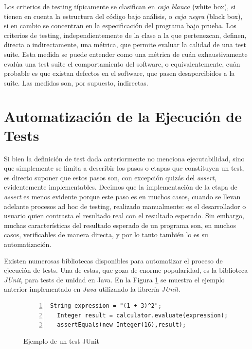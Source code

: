 Los criterios de testing t\'ipicamente se clasifican en \emph{caja blanca} (white box), si tienen en cuenta la estructura del c\'odigo bajo an\'alisis, o \emph{caja negra} (black box), si en cambio se concentran en la especificaci\'on del programa bajo prueba. Los criterios de testing, independientemente de la clase a la que pertenezcan, definen, directa o indirectamente, una m\'etrica, que permite evaluar la calidad de una test suite. Esta medida se puede entender como una m\'etrica de cu\'an exhaustivamente eval\'ua una test suite el comportamiento del software, o equivalentemente, cu\'an probable es que existan defectos en el software, que pasen desapercibidos a la suite. Las medidas son, por supuesto, indirectas. 

\section{Automatizaci\'on de la Ejecuci\'on de Tests}
\label{sec:preliminares.testing.automation}

Si bien la definici\'on de test dada anteriormente no menciona ejecutabilidad, sino que simplemente se limita a describir los pasos o etapas que constituyen un test, es directo suponer que estos pasos son, con excepci\'on quiz\'as del \emph{assert}, evidentemente implementables. Decimos que la implementaci\'on de la etapa de \emph{assert} es menos evidente porque este paso es en muchos casos, cuando se llevan adelante procesos ad hoc de testing, realizado manualmente: es el desarrollador o usuario quien contrasta el resultado real con el resultado esperado. Sin embargo, muchas caracter\'isticas del resultado esperado de un programa son, en muchos casos, verificables de manera directa, y por lo tanto tambi\'en lo es su automatizaci\'on. 

Existen numerosas bibliotecas disponibles para automatizar el proceso de ejecuci\'on de tests. Una de estas, que goza de enorme popularidad, es la biblioteca \emph{JUnit}, para tests de unidad en Java. En la Figura \ref{figures.examples.test.junit} se muestra el ejemplo anterior implementado en \emph{Java} utilizando la librer\'ia \emph{JUnit}.

\begin{figure}[ht!]
	\begin{lstlisting}[frame=single, mathescape=true,numbers=left,framexleftmargin=1.5em]
  String expression = "(1 + 3)^2";
  Integer result = calculator.evaluate(expression);
  assertEquals(new Integer(16),result);
	\end{lstlisting}
	\caption{Ejemplo de un test JUnit}
	\label{figures.examples.test.junit}
\end{figure}

